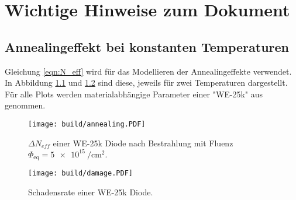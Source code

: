\chapter{Wichtige Hinweise zum Dokument}\label{make}
\section{Annealingeffekt bei konstanten Temperaturen}
Gleichung \ref{eqn:N_eff} wird für das Modellieren der Annealingeffekte verwendet. In
Abbildung \ref{fig:N_eff} und \ref{fig:damage} sind diese, jeweils für zwei Temperaturen dargestellt.
Für alle Plots werden materialabhängige
Parameter einer "WE-25k" aus \cite{moll} genommen.

\begin{figure}
    \texttt{[image: build/annealing.PDF]}
    \caption{$\Delta N_{eff}$ einer WE-25k Diode nach Bestrahlung mit Fluenz $\Phi_{\mathrm{eq}} = \SI{5e15}{\per\centi\meter\squared}.$}
    \label{fig:N_eff}
\end{figure}

\begin{figure}
    \texttt{[image: build/damage.PDF]}
    \caption{Schadensrate einer WE-25k Diode.}
    \label{fig:damage}
\end{figure}
